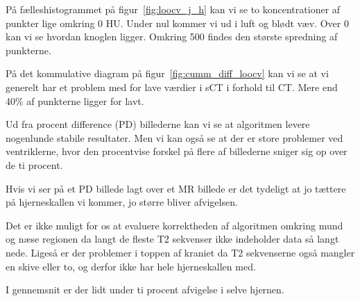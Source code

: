 På fælleshistogrammet på figur~\ref{fig:loocv_j_h} kan vi se to koncentrationer af punkter lige omkring 0 HU. Under nul kommer vi ud i luft og blødt væv. Over 0 kan vi se hvordan knoglen ligger. Omkring 500 findes den største spredning af punkterne.

På det kommulative diagram på figur~\ref{fig:cumm_diff_loocv} kan vi se at vi generelt har et problem med for lave værdier i sCT i forhold til CT. Mere end 40\% af punkterne ligger for lavt.

Ud fra procent difference (PD) billederne kan vi se at algoritmen levere nogenlunde stabile resultater. Men vi kan også se at der er store problemer ved ventriklerne, hvor den procentvise forskel på flere af billederne sniger sig op over de ti procent.

Hvis vi ser på et PD billede lagt over et MR billede er det tydeligt at jo tættere på hjerneskallen vi kommer, jo større bliver afvigelsen.

Det er ikke muligt for os at evaluere korrektheden af algoritmen omkring mund og næse regionen da langt de fleste T2 sekvenser ikke indeholder data så langt nede. Ligeså er der problemer i toppen af kraniet da T2 sekvenserne også mangler en skive eller to, og derfor ikke har hele hjerneskallen med.

I gennemsnit er der lidt under ti procent afvigelse i selve hjernen.


